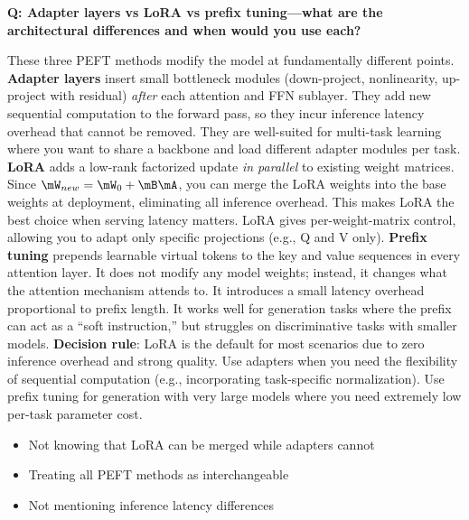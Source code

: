 \begin{interviewq}
\textbf{Q: Adapter layers vs LoRA vs prefix tuning---what are the architectural differences and when would you use each?}

 \quad {} \quad \badgefreq{\freqmed}

\stronganswer These three PEFT methods modify the model at fundamentally different points. \textbf{Adapter layers} insert small bottleneck modules (down-project, nonlinearity, up-project with residual) \textit{after} each attention and FFN sublayer. They add new sequential computation to the forward pass, so they incur inference latency overhead that cannot be removed. They are well-suited for multi-task learning where you want to share a backbone and load different adapter modules per task. \textbf{LoRA} adds a low-rank factorized update \textit{in parallel} to existing weight matrices. Since $\mW_{new} = \mW_0 + \mB\mA$, you can merge the LoRA weights into the base weights at deployment, eliminating all inference overhead. This makes LoRA the best choice when serving latency matters. LoRA gives per-weight-matrix control, allowing you to adapt only specific projections (e.g., Q and V only). \textbf{Prefix tuning} prepends learnable virtual tokens to the key and value sequences in every attention layer. It does not modify any model weights; instead, it changes what the attention mechanism attends to. It introduces a small latency overhead proportional to prefix length. It works well for generation tasks where the prefix can act as a ``soft instruction,'' but struggles on discriminative tasks with smaller models. \textbf{Decision rule}: LoRA is the default for most scenarios due to zero inference overhead and strong quality. Use adapters when you need the flexibility of sequential computation (e.g., incorporating task-specific normalization). Use prefix tuning for generation with very large models where you need extremely low per-task parameter cost.

\redflags
\begin{itemize}
    \item Not knowing that LoRA can be merged while adapters cannot
    \item Treating all PEFT methods as interchangeable
    \item Not mentioning inference latency differences
\end{itemize}



\end{interviewq}
